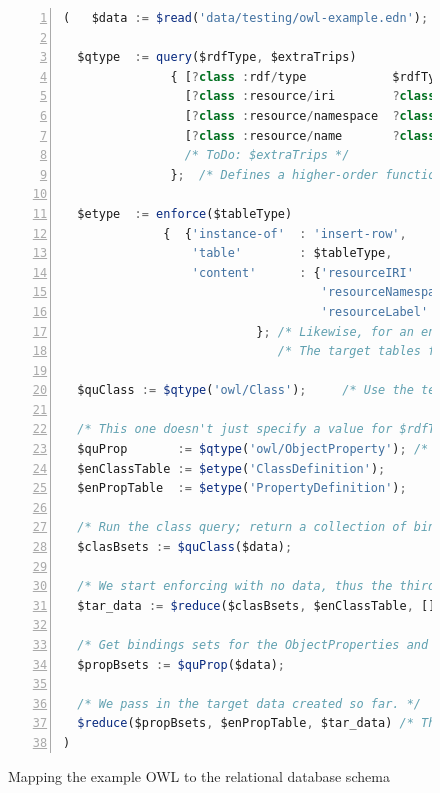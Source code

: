 \documentclass[9pt,letterpaper]{article}
\begin{document}
\begin{figure}[H]
  \caption{Mapping the example OWL to the relational database schema}
  \label{code:mapping-owl-to-rdbms}
\begin{lstlisting}[language=JavaScript,numberstyle=\scriptsize,basicstyle=\ttfamily\scriptsize,numbers=left,stepnumber=1,breaklines=true]
  (   $data := $read('data/testing/owl-example.edn');

  $qtype  := query($rdfType, $extraTrips)
               { [?class :rdf/type            $rdfType]
                 [?class :resource/iri        ?class-iri]
                 [?class :resource/namespace  ?class-ns]
                 [?class :resource/name       ?class-name]
                 /* ToDo: $extraTrips */
               };  /* Defines a higher-order function, a template of sorts. */

  $etype  := enforce($tableType)
              {  {'instance-of'  : 'insert-row',
                  'table'        : $tableType,
                  'content'      : {'resourceIRI'       : ?class-iri,
                                    'resourceNamespace' : ?class-ns,
                                    'resourceLabel'     : ?class-name}}
                           }; /* Likewise, for an enforce template. */
                              /* The target tables for objects and relations a very similar. */

  $quClass := $qtype('owl/Class');     /* Use the template, here and the next three assignments. */

  /* This one doesn't just specify a value for $rdfType, but for $extraTrips. */
  $quProp       := $qtype('owl/ObjectProperty'); /* ToDo: ,queryTriples{[?class :rdfs/domain ?domain] [?class :rdfs/range ?range]}); */
  $enClassTable := $etype('ClassDefinition');
  $enPropTable  := $etype('PropertyDefinition');

  /* Run the class query; return a collection of binding sets about classes. */
  $clasBsets := $quClass($data);

  /* We start enforcing with no data, thus the third argument is []. */
  $tar_data := $reduce($clasBsets, $enClassTable, []);

  /* Get bindings sets for the ObjectProperties and make similar tables. */
  $propBsets := $quProp($data);

  /* We pass in the target data created so far. */
  $reduce($propBsets, $enPropTable, $tar_data) /* The code block returns the target data. */
)
\end{lstlisting}
\end{figure}
\end{document}
